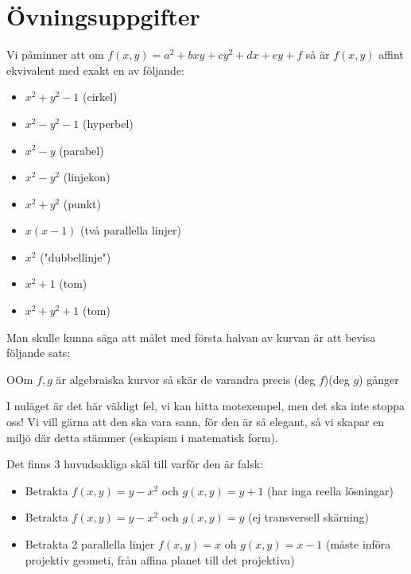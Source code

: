 \section{Övningsuppgifter}
\par\bigskip
\noindent Vi påminner att om $f(x,y) = a^2+bxy+cy^2+dx+ey+f$ så är $f(x,y)$ affint ekvivalent med exakt en av följande:
\par\bigskip
\begin{itemize}
  \item $x^2+y^2-1$ (cirkel)
  \item $x^2-y^2-1$ (hyperbel)
  \item $x^2-y$ (parabel)
  \item $x^2-y^2$ (linjekon)
  \item $x^2+y^2$ (punkt)
  \item$x(x-1)$ (två parallella linjer)
  \item $x^2$ ("dubbellinje")
  \item $x^2+1$ (tom)
  \item $x^2+y^2+1$ (tom)
\end{itemize}
\par\bigskip
\noindent Man skulle kunna säga att målet med första halvan av kurvan är att bevisa följande sats:
\par\bigskip
\begin{theo}
  OOm $f,g$ är algebraiska kurvor så skär de varandra precis (deg $f$)(deg $g$) gånger
\end{theo}
\par\bigskip
\noindent I nuläget är det här väldigt fel, vi kan hitta motexempel, men det ska inte stoppa oss! Vi vill gärna att den ska vara sann, för den är så elegant, så vi skapar en miljö där detta stämmer (eskapism i matematisk form).\par
\noindent Det finns 3 huvudsakliga skäl till varför den är falsk:
\begin{itemize}
  \item Betrakta $f(x,y) = y-x^2$ och $g(x,y) = y+1$ (har inga reella lösningar)
  \item Betrakta $f(x,y) = y-x^2$ och $g(x,y) = y$ (ej transversell skärning)
  \item Betrakta 2 parallella linjer $f(x,y)=x$ oh $g(x,y) = x-1$ (måste införa projektiv geometi, från affina planet till det projektiva)
\end{itemize}
\par\bigskip
